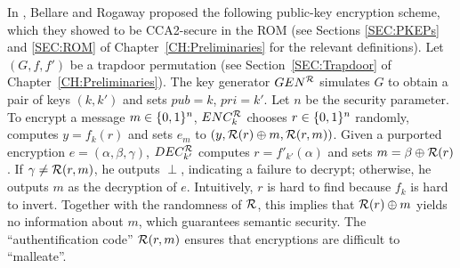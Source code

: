 In \cite{bellare:rompractical}, Bellare and Rogaway proposed the following
public-key encryption scheme, which they showed to be CCA2-secure in the ROM (see Sections
\ref{SEC:PKEPs} and \ref{SEC:ROM} of Chapter~\ref{CH:Preliminaries} for the
relevant definitions).  Let 
$(G,f,f')$ be a trapdoor permutation 
(see Section~\ref{SEC:Trapdoor} of Chapter~\ref{CH:Preliminaries}). The key
generator $GEN^{\mathcal{R}}$ simulates $G$ to obtain a pair of keys $(k,k')$ and sets
$pub = k$, $pri = k'$. Let $n$ be the security parameter. To encrypt a message
$m \in \{0,1\}^{n}$, $ENC^{\mathcal{R}}_k$ chooses $r \in \{0,1\}^{n}$ randomly, computes $y
= f_k(r)$ and sets $e_m$ to $(y,\mathcal{R}(r)\oplus m, \mathcal{R}(r,m))$.  Given a
purported encryption $e = (\alpha,\beta,\gamma)$, $DEC_{k'}^{\mathcal{R}}$ computes $r
= f'_{k'}(\alpha)$ and sets $m = \beta \oplus \mathcal{R}(r)$. If $\gamma \neq
\mathcal{R}(r,m)$, he outputs $\perp$, indicating a failure to decrypt; otherwise,
he outputs $m$ as the decryption of $e$. Intuitively, $r$ is hard to find
because $f_k$ is hard to invert. Together with the randomness of $\mathcal{R}$, this
implies that $\mathcal{R}(r) \oplus m$ yields no information about $m$, which
guarantees semantic security. The ``authentification code'' $\mathcal{R}(r,m)$
ensures that encryptions are difficult to ``malleate''. 

